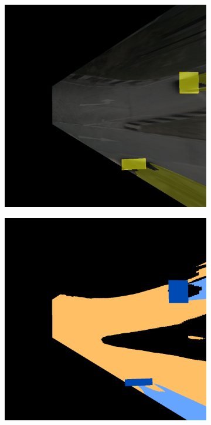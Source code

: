 \begin{figure}[!ht]
\begin{subfigure}[b]{0.22\textwidth}
        \caption{}
        \label{fig:bev_occupancy_occlusion_b}
    \end{subfigure}
    \hfill
    \begin{subfigure}[b]{0.22\textwidth}
        \includegraphics[width=\textwidth]{images/methodology/bev_occupancy_oclusion/bev_occ_9.png}
        \caption{}
        \label{fig:bev_occupancy_occlusion_c}
    \end{subfigure}
    \hfill
    \begin{subfigure}[b]{0.22\textwidth}
        \includegraphics[width=\textwidth]{images/methodology/bev_occupancy_oclusion/dt_occ_mask_colored_9.png}
        \caption{}
        \label{fig:bev_occupancy_occlusion_d}
    \end{subfigure}


\end{figure}
